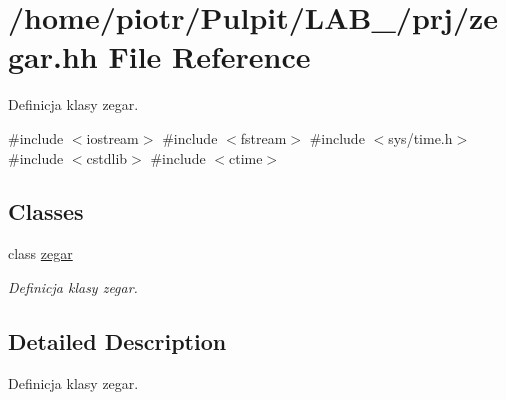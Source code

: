 \hypertarget{zegar_8hh}{\section{/home/piotr/\-Pulpit/\-L\-A\-B\-\_/prj/zegar.hh \-File \-Reference}
\label{zegar_8hh}
}


\-Definicja klasy zegar.  


{\ttfamily \#include $<$iostream$>$}\*
{\ttfamily \#include $<$fstream$>$}\*
{\ttfamily \#include $<$sys/time.\-h$>$}\*
{\ttfamily \#include $<$cstdlib$>$}\*
{\ttfamily \#include $<$ctime$>$}\*
\subsection*{\-Classes}
\begin{DoxyCompactItemize}
\item 
class \hyperlink{classzegar}{zegar}
\begin{DoxyCompactList}\small\item\em \-Definicja klasy zegar. \end{DoxyCompactList}\end{DoxyCompactItemize}


\subsection{\-Detailed \-Description}
\-Definicja klasy zegar. 